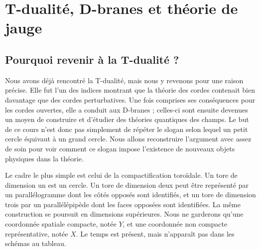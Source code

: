 \chapter{T-dualité, D-branes et théorie de jauge}


\section{Pourquoi revenir à la T-dualité ?}

Nous avons déjà rencontré la T-dualité, mais nous y revenons pour une raison précise. Elle fut l’un des indices montrant que la théorie des cordes contenait bien davantage que des cordes perturbatives. Une fois comprises ses conséquences pour les cordes ouvertes, elle a conduit aux D-branes ; celles-ci sont ensuite devenues un moyen de construire et d’étudier des théories quantiques des champs. Le but de ce cours n’est donc pas simplement de répéter le slogan selon lequel un petit cercle équivaut à un grand cercle. Nous allons reconstruire l’argument avec assez de soin pour voir comment ce slogan impose l’existence de nouveaux objets physiques dans la théorie.

Le cadre le plus simple est celui de la compactification toroïdale. Un tore de dimension un est un cercle. Un tore de dimension deux peut être représenté par un parallélogramme dont les côtés opposés sont identifiés, et un tore de dimension trois par un parallélépipède dont les faces opposées sont identifiées. La même construction se poursuit en dimensions supérieures. Nous ne garderons qu’une coordonnée spatiale compacte, notée \(Y\), et une coordonnée non compacte représentative, notée \(X\). Le temps est présent, mais n’apparaît pas dans les schémas au tableau.

